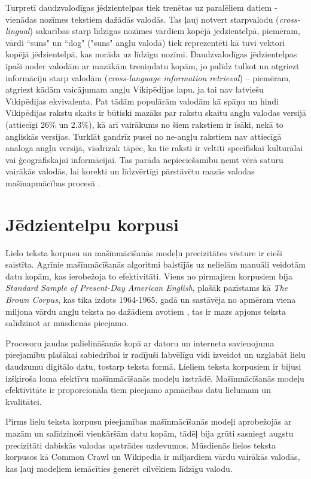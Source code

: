 Turpretī daudzvalodīgas jēdzientelpas tiek trenētas uz paralēliem datiem - vienādas nozīmes tekstiem dažādās valodās. Tas ļauj notvert starpvalodu (\textit{cross-lingual}) sakarības starp līdzīgas nozīmes vārdiem kopējā jēdzientelpā, piemēram, vārdi “suns" un “dog" ("suns" angļu valodā) tiek reprezentēti kā tuvi vektori kopējā jēdzientelpā, kas norāda uz līdzīgu nozīmi. Daudzvalodīgas jēdzientelpas īpaši noder valodām ar mazākām treniņdatu kopām, jo palīdz tulkot un atgriezt informāciju starp valodām (\textit{cross-language information retrieval}) -- piemēram, atgriezt kādām vaicājumam angļu Vikipēdijas lapu, ja tai nav latviešu Vikipēdijas ekvivalenta. Pat tādām populārām valodām kā spāņu un hindi Vikipēdijas rakstu skaits ir būtiski mazāks par rakstu skaitu angļu valodas versijā (attiecīgi 26\% un 2.3\%), kā arī vairākums no šiem rakstiem ir īsāki, nekā to angliskās versijas. Turklāt gandrīz pusei no ne-angļu rakstiem nav attiecīgā analoga angļu versijā, visdrīzāk tāpēc, ka tie raksti ir veltīti specifiskai kulturālai vai ģeogrāfiskajai informācijai. Tas parāda nepieciešamību ņemt vērā saturu vairākās valodās, lai korekti un līdzvērtīgi pārstāvētu mazās valodas mašīnapmācības procesā \cite{roy2020}.


\section{Jēdzientelpu korpusi}


Lielo teksta korpusu un mašīnmācīšanās modeļu precizitātes vēsture ir cieši saistīta. Agrīnie mašīnmācīšanās algoritmi balstījās uz nelielām manuāli veidotām datu kopām, kas ierobežoja to efektivitāti. Viens no pirmajiem korpusiem bija \textit{Standard Sample of Present-Day American English}, plašāk pazīstams kā \textit{The Brown Corpus}, kas tika izdots 1964-1965. gadā un sastāvēja no apmēram viena miljona vārdu angļu teksta no dažādiem avotiem \cite{brown-corpus}, tas ir mazs apjoms teksta salīdzinot ar mūsdienās pieejamo.

Procesoru jaudas palielināšanās kopā ar datoru un interneta savienojuma pieejamību plašākai sabiedrībai ir radījuši labvēlīgu vidi izveidot un uzglabāt lielu daudzumu digitālo datu, tostarp teksta formā. Lieliem teksta korpusiem ir bijusi izšķiroša loma efektīvu mašīnmācīšanās modeļu izstrādē. Mašīnmācīšanās modeļu efektivitāte ir proporcionāla tiem pieejamo apmācības datu lielumam un kvalitātei. %

Pirms lielu teksta korpusu pieejamības mašīnmācīšanās modeļi aprobežojās ar mazām un salīdzinoši vienkāršām datu kopām, tādēļ bija grūti sasniegt augstu precizitāti dabiskās valodas apstrādes uzdevumos. Mūsdienās lielos teksta korpusos kā Common Crawl un Wikipedia ir miljardiem vārdu vairākās valodās, kas ļauj modeļiem iemācīties ģenerēt cilvēkiem līdzīgu valodu.

